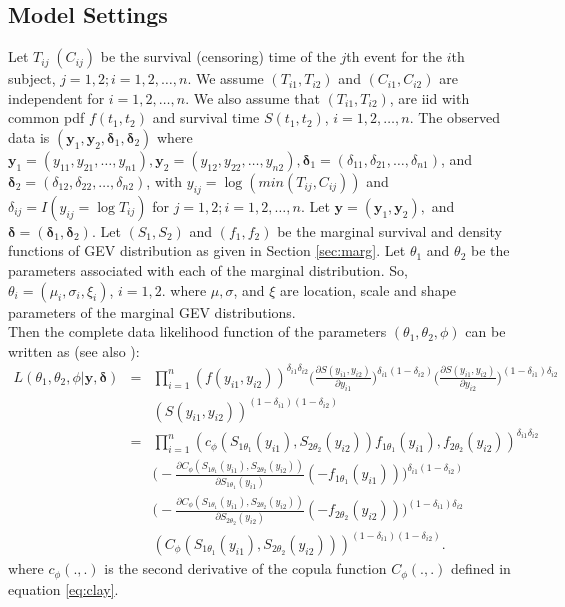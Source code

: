 \documentclass[11pt]{article}
\theoremstyle{remboldstyle}
\newcommand{\y}{{\boldsymbol{y}}}
\newcommand{\oy}{{\boldsymbol{y}_{1}}}
\newcommand{\ty}{{\boldsymbol{y}_{2}}}
\newcommand{\de}{{\boldsymbol{\delta}}}
\newcommand{\ode}{{\boldsymbol{\delta}_{1}}}
\newcommand{\tde}{{\boldsymbol{\delta}_{2}}}
\begin{document}
\subsection{Model Settings}
\noindent
Let $T_{ij}\; (C_{ij})$ be the survival (censoring) time of the $j$th
event for the $i$th subject, $j=1, 2; i=1, 2,\dots, n$. We assume
$(T_{i1}, T_{i2})$ and $(C_{i1}, C_{i2})$ are independent for
$i=1, 2,\dots, n$. We also assume that $(T_{i1}, T_{i2})$, are iid
with common pdf $f(t_1, t_2)$ and survival time $S(t_1, t_2)$, $i=1, 2,\dots, n$.
The observed data is $(\oy, \ty, \ode, \tde)$ where
$\oy=(y_{11}, y_{21},\dots,y_{n1}), \ty=(y_{12}, y_{22},\dots,y_{n2}),
\ode=(\delta_{11}, \delta_{21},\dots,\delta_{n1})$, and
$\tde=(\delta_{12}, \delta_{22},\dots, \delta_{n2})$, with $y_{ij}
= \log(min (T_{ij}, C_{ij}))$ and $\delta_{ij}= I(y_{ij} = \log T_{ij})$ for
$j=1, 2; i=1, 2,\dots, n$. Let $\y =(\oy, \ty),$ and $\de =(\ode,
\tde)$.  Let $(S_1, S_2)$ and $(f_1, f_2)$ be the marginal survival
and density functions of GEV distribution as given in Section
\ref{sec:marg}.  Let $\theta_1$ and $\theta_2$
be the parameters associated with each of the marginal distribution.
So, $\theta_i = (\mu_i, \sigma_i, \xi_i)$, $i = 1,2$. where $\mu,
\sigma$, and $\xi$ are location, scale and shape parameters of the
marginal GEV distributions. \\ Then the complete data likelihood function  of the parameters $(\theta_1, \theta_2, \phi)$ can be written as (see also \cite{chen:2012}):
\begin{eqnarray}
  \label{eq:lik}
  L(\theta_1, \theta_2, \phi | \y, \de) &=& \prod_{i=1}^n (f(y_{i1}, y_{i2}))^{\delta_{i1} \delta_{i2}}
\Big(\frac{\partial S(y_{i1}, y_{i2})}{\partial y_{i1}}\Big)^{\delta_{i1} (1- \delta_{i2})}
\Big(\frac{\partial S(y_{i1}, y_{i2})}{\partial y_{i2}}\Big)^{(1- \delta_{i1}) \delta_{i2}}
\nonumber\\
&& (S(y_{i1}, y_{i2}))^{(1-\delta_{i1}) (1-\delta_{i2})} \nonumber\\
&=& \prod_{i=1}^n (c_\phi(S_{1 \theta_1} (y_{i1}), S_{2 \theta_2}(y_{i2})) f_{1 \theta_1}(y_{i1}), f_{2 \theta_2}(y_{i2}))^{\delta_{i1} \delta_{i2}}\nonumber\\
&&\Big(-\frac{\partial C_\phi(S_{1 \theta_1} (y_{i1}), S_{2 \theta_2}(y_{i2}))}{\partial S_{1 \theta_1} (y_{i1})}(-f_{1 \theta_1}(y_{i1}))\Big)^{\delta_{i1} (1- \delta_{i2})}\nonumber\\
&&
\Big(-\frac{\partial C_\phi(S_{1 \theta_1} (y_{i1}), S_{2 \theta_2}(y_{i2}))}{\partial S_{2 \theta_2} (y_{i2})}(-f_{2 \theta_2}(y_{i2}))\Big)^{(1-\delta_{i1})\delta_{i2}}\nonumber\\
&&
(C_\phi(S_{1 \theta_1} (y_{i1}), S_{2 \theta_2}(y_{i2})))^{(1-\delta_{i1}) (1-\delta_{i2})} .
\end{eqnarray}
where $c_{\phi}(.,.)$ is the second derivative of the copula function $C_{\phi}(.,.)$ defined in equation \ref{eq:clay}.
\end{document}

